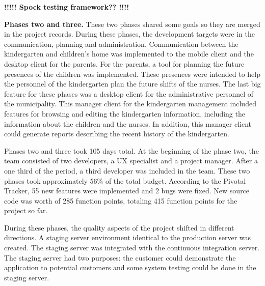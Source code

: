 \textbf{!!!!! Spock testing framework?? !!!!}


\textbf{Phases two and three.} These two phases shared some goals so they are merged in the project records. During these phases, the development targets were in the communication, planning and administration. Communication between the kindergarten and children's home was implemented to the mobile client and the desktop client for the parents. For the parents, a tool for planning the future presences of the children was implemented. These presences were intended to help the personnel of the kindergarten plan the future shifts of the nurses. The last big feature for these phases was a desktop client for the administrative personnel of the municipality. This manager client for the kindergarten management included features for browsing and editing the kindergarten information, including the information about the children and the nurses. In addition, this manager client could generate reports describing the recent history of the kindergarten.

Phases two and three took 105 days total. At the beginning of the phase two, the team consisted of two developers, a UX specialist and a project manager. After a one third of the period, a third developer was included in the team. These two phases took approximately 56\% of the total budget. According to the Pivotal Tracker, 55 new features were implemented and 2 bugs were fixed. New source code was worth of 285 function points, totaling 415 function points for the project so far.


During these phases, the quality aspects of the project shifted in different directions. A staging server environment identical to the production server was created. The staging server was integrated with the continuous integration server. The staging server had two purposes: the customer could demonstrate the application to potential customers and some system testing could be done in the staging server. 

